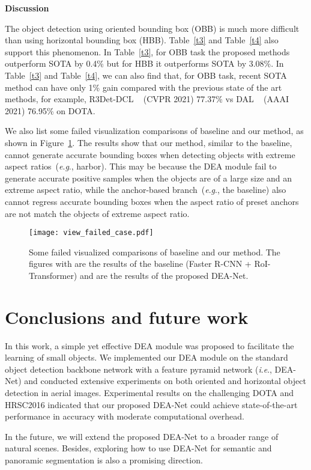 \documentclass[journal]{IEEEtran}
\newcommand{\myparagraph}[1]{\vspace{0.1em}\noindent\textbf{#1}}
\newcommand{\ie}{\textit{i}.\textit{e}.}
\newcommand{\eg}{\textit{e}.\textit{g}.}
\begin{document}
\myparagraph{Discussion} 

The object detection using oriented bounding box (OBB) is much more difficult than using horizontal bounding box (HBB). Table~\ref{t3} and Table~\ref{t4} also support this phenomenon. In Table~\ref{t3}, for OBB task the proposed methods outperform SOTA by 0.4\% but for HBB it outperforms SOTA by 3.08\%. In Table~\ref{t3} and Table~\ref{t4}, we can also find that, for OBB task, recent SOTA method can have only  1\% gain compared with the previous state of the art methods, for example, R3Det-DCL ~\cite{yang2020dense} (CVPR 2021) 77.37\% vs DAL ~\cite{ming2020dynamic} (AAAI 2021) 76.95\% on DOTA.

We also list some failed visualization comparisons of baseline and our method, as shown in Figure~\ref{view_failed_case}. The results show that our method, similar to the baseline, cannot generate accurate bounding boxes when detecting objects with extreme aspect ratios~(\eg, harbor). This may be because the DEA module fail to generate accurate positive samples when the objects are of a large size and an extreme aspect ratio, while the anchor-based branch~(\eg, the baseline) also cannot regress accurate bounding boxes when the aspect ratio of preset anchors are not match the objects of extreme aspect ratio.
 
\begin{figure}[!htb]
	\centering
	\texttt{[image: view\_failed\_case.pdf]}
	\caption{Some failed visualized comparisons of baseline and our method. The figures with  are the results of the baseline (Faster R-CNN + RoI-Transformer) and  are the results of the proposed DEA-Net.}
	\label{view_failed_case}
\end{figure}


\section{Conclusions and future work}
In this work, a simple yet effective DEA module was proposed to facilitate the learning of small objects. We implemented our DEA module on the standard object detection backbone network with a feature pyramid network (\ie, DEA-Net) and conducted extensive experiments on both oriented and horizontal object detection in aerial images. Experimental results on the challenging DOTA and HRSC2016 indicated that our proposed DEA-Net could achieve state-of-the-art performance in accuracy with moderate computational overhead.

In the future, we will extend the proposed DEA-Net to a broader range of natural scenes. Besides, exploring how to use DEA-Net for semantic and panoramic segmentation is also a promising direction.
\end{document}
